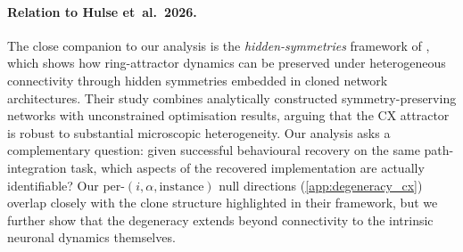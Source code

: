 \documentclass[11pt]{article}
\begin{document}
\paragraph{Relation to Hulse et~al.\ 2026.}
The close companion to our analysis is the
\emph{hidden-symmetries} framework of \citet{hulse2026}, which
shows how ring-attractor dynamics can be preserved under
heterogeneous connectivity through hidden symmetries embedded in
cloned network architectures. Their study combines analytically
constructed symmetry-preserving networks with unconstrained
optimisation results, arguing that the CX attractor is robust to
substantial microscopic heterogeneity. Our analysis asks a
complementary question: given successful behavioural recovery on
the same path-integration task, which aspects of the recovered
implementation are actually identifiable? Our
per-$(i,\alpha,\mathrm{instance})$ null directions
(\cref{app:degeneracy_cx}) overlap closely with the clone structure
highlighted in their framework, but we further show that the
degeneracy extends beyond connectivity to the intrinsic neuronal
dynamics themselves.
\end{document}
